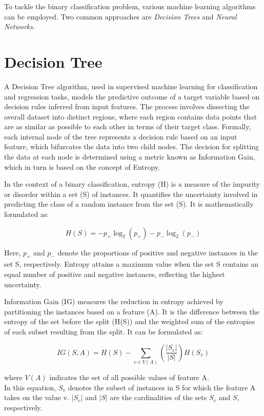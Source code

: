 To tackle the binary classification problem, various machine learning algorithms can be employed. Two common approaches are \textit{Decision Trees} and \textit{Neural Networks}. 

\section{Decision Tree}
A Decision Tree algorithm, used in supervised machine learning for classification and regression tasks, models the predictive outcome of a target variable based on decision rules inferred from input features. The process involves dissecting the overall dataset into distinct regions, where each region contains data points that are as similar as possible to each other in terms of their target class. Formally, each internal node of the tree represents a decision rule based on an input feature, which bifurcates the data into two child nodes. The decision for splitting the data at each node is determined using a metric known as Information Gain, which in turn is based on the concept of Entropy.

In the context of a binary classification, entropy (H) is a measure of the impurity or disorder within a set (S) of instances. It quantifies the uncertainty involved in predicting the class of a random instance from the set (S). It is mathematically formulated as:

\begin{equation}
	H(S) = - p_{+} \log_{2}(p_{+}) - p_{-} \log_{2}(p_{-})
\end{equation}

Here, $p_+$ and $p_-$ denote the proportions of positive and negative instances in the set S, respectively. Entropy attains a maximum value when the set S contains an equal number of positive and negative instances, reflecting the highest uncertainty.

Information Gain (IG) measures the reduction in entropy achieved by partitioning the instances based on a feature (A). It is the difference between the entropy of the set before the split (H(S)) and the weighted sum of the entropies of each subset resulting from the split. It can be formulated as:

\begin{equation}
	IG(S, A) = H(S) - \sum_{v \in V(A)} \left(\frac{|S_v|}{|S|}\right) H(S_v)
\end{equation}

where $V(A)$ indicates the set of all possible values of feature A.\\
In this equation, $S_v$ denotes the subset of instances in S for which the feature A takes on the value v. $|S_v|$ and $|S|$ are the cardinalities of the sets $S_v$ and $S$, respectively.\\


